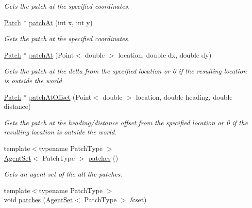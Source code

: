 \begin{DoxyCompactItemize}
\begin{DoxyCompactList}\small\item\em Gets the patch at the specified coordinates. \end{DoxyCompactList}\item 
\hyperlink{classrepast_1_1relogo_1_1_patch}{Patch} $\ast$ \hyperlink{classrepast_1_1relogo_1_1_observer_ae6c00da8dd18f715e5685b302b6819c8}{patch\-At} (int x, int y)
\begin{DoxyCompactList}\small\item\em Gets the patch at the specified coordinates. \end{DoxyCompactList}\item 
\hyperlink{classrepast_1_1relogo_1_1_patch}{Patch} $\ast$ \hyperlink{classrepast_1_1relogo_1_1_observer_a94254d970a0e8f8409b1fa0aca0aab5b}{patch\-At} (Point$<$ double $>$ location, double dx, double dy)
\begin{DoxyCompactList}\small\item\em Gets the patch at the delta from the specified location or 0 if the resulting location is outside the world. \end{DoxyCompactList}\item 
\hyperlink{classrepast_1_1relogo_1_1_patch}{Patch} $\ast$ \hyperlink{classrepast_1_1relogo_1_1_observer_acb1163537fb7f53ccb6cf99d1cfdff47}{patch\-At\-Offset} (Point$<$ double $>$ location, double heading, double distance)
\begin{DoxyCompactList}\small\item\em Gets the patch at the heading/distance offset from the specified location or 0 if the resulting location is outside the world. \end{DoxyCompactList}\item 
{\footnotesize template$<$typename Patch\-Type $>$ }\\\hyperlink{classrepast_1_1relogo_1_1_agent_set}{Agent\-Set}$<$ Patch\-Type $>$ \hyperlink{classrepast_1_1relogo_1_1_observer_ad68866a2584551d27c9bb6c53aca5f20}{patches} ()
\begin{DoxyCompactList}\small\item\em Gets an agent set of the all the patches. \end{DoxyCompactList}\item 
{\footnotesize template$<$typename Patch\-Type $>$ }\\void \hyperlink{classrepast_1_1relogo_1_1_observer_a2384690c4e773727acdccaa7fc314bcd}{patches} (\hyperlink{classrepast_1_1relogo_1_1_agent_set}{Agent\-Set}$<$ Patch\-Type $>$ \&set)

\end{DoxyCompactItemize}
